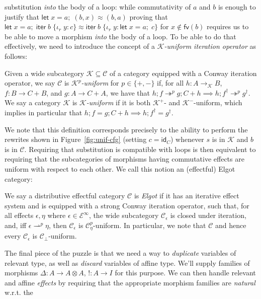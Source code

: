 \documentclass[acmsmall,screen,review]{acmart}
\newcommand{\mc}[1]{\ensuremath{\mathcal{#1}}}
\newcommand{\ms}[1]{\ensuremath{\mathsf{#1}}}
\newcommand{\lto}{:}
\newcommand{\linr}[1]{\iota_r\;{#1}}
\newcommand{\letexpr}[3]{\ensuremath{\ms{let}\;#1 = #2;\;#3}}
\newcommand{\liter}[3]{\ms{iter}\;#1\;\{ \linr{#2} \lto #3 \}}
\newcommand{\cref}{\twoheadrightarrow}
\newcommand{\rightmove}{\rightharpoonup}
\begin{document}
substitution \emph{into} the body of a loop: while commutativity of $a$ and $b$ is enough to justify
that
$
\letexpr{x}{a}{(b, x)} \approx (b, a)
$
proving that
$
\letexpr{x}{a}{\liter{b}{y}{c}} \approx \liter{b}{y}{\letexpr{x}{a}{c}}
$
for $x \notin \ms{fv}(b)$ requires us to be able to move a morphism \emph{into} the body of a loop.
To be able to do that effectively, we need to introduce the concept of a \emph{\mc{K}-uniform
iteration operator} as follows:
\begin{definition}[Uniformity]
  Given a wide subcategory $\mc{K} \subseteq \mc{C}$ of a category equipped with a Conway iteration
  operator, we say $\mc{C}$ is \emph{$\mc{K}^p$-uniform} for $p \in \{+, -\}$ if, for all $h : A
  \to_{\mc{K}} B$, $f : B \to C + B$, and $g : A \to C + A$, we have that
  $
  h ; f \cref^p g ; C + h \implies h ; f^\dagger \cref^p g^\dagger 
  $.
  We say a category $\mc{K}$ is \emph{$\mc{K}$-uniform} if it is both $\mc{K}^+$- and
  $\mc{K}^-$-uniform, which implies in particular that
  $
  h ; f = g ; C + h \implies h ; f^\dagger = g^\dagger 
  $.
\end{definition}
We note that this definition corresponds precisely to the ability to perform the rewrites shown in
Figure~\ref{fig:unif-cfg} (setting $c = \ms{id}_C$) whenever $s$ is in $\mc{K}$ and $b$ is in
$\mc{C}$. Requiring that substitution is compatible with loops is then equivalent to requiring that
the subcategories of morphisms having commutative effects are uniform with respect to each other. We
call this notion an (effectful) Elgot category:
\begin{definition}
  We say a distributive effectful category $\mc{C}$ is \emph{Elgot} if it has an iterative effect
  system and is equipped with a strong Conway iteration operator, such that, for all effects
  $\epsilon, \eta$ where $\epsilon \in \mc{E}^\infty$, the wide subcategory $\mc{C}_\epsilon$ is
  closed under iteration, and, iff $\epsilon \rightmove^p \eta$, then $\mc{C}_\epsilon$ is
  $\mc{C}_\eta^p$-uniform. 
  In particular, we note that $\mc{C}$ and hence every $\mc{C}_\epsilon$ is
  $\mc{C}_\bot$-uniform.
\end{definition}
The final piece of the puzzle is that we need a way to \emph{duplicate} variables of relevant type,
as well as \emph{discard} variables of affine type. We'll supply families of morphisms $\Delta: A
\to A \otimes A$, $!: A \to I$ for this purpose. We can then handle relevant and affine
\emph{effects} by requiring that the appropriate morphism families are \emph{natural} w.r.t. the
\end{document}

